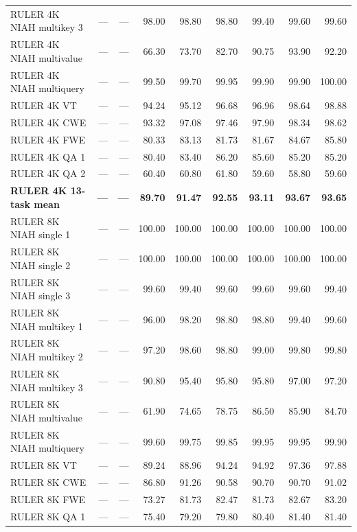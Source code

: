 \begin{longtable}{@{}lrrrrrrrr@{}}
RULER 4K NIAH multikey 3 & --- & --- & 98.00 & 98.80 & 98.80 & 99.40 & 99.60 & 99.60 \\
RULER 4K NIAH multivalue & --- & --- & 66.30 & 73.70 & 82.70 & 90.75 & 93.90 & 92.20 \\
RULER 4K NIAH multiquery & --- & --- & 99.50 & 99.70 & 99.95 & 99.90 & 99.90 & 100.00 \\
RULER 4K VT & --- & --- & 94.24 & 95.12 & 96.68 & 96.96 & 98.64 & 98.88 \\
RULER 4K CWE & --- & --- & 93.32 & 97.08 & 97.46 & 97.90 & 98.34 & 98.62 \\
RULER 4K FWE & --- & --- & 80.33 & 83.13 & 81.73 & 81.67 & 84.67 & 85.80 \\
RULER 4K QA 1 & --- & --- & 80.40 & 83.40 & 86.20 & 85.60 & 85.20 & 85.20 \\
RULER 4K QA 2 & --- & --- & 60.40 & 60.80 & 61.80 & 59.60 & 58.80 & 59.60 \\
\hline
\textbf{RULER 4K 13-task mean} & \textbf{---} & \textbf{---} & \textbf{89.70} & \textbf{91.47} & \textbf{92.55} & \textbf{93.11} & \textbf{93.67} & \textbf{93.65} \\
\hline
RULER 8K NIAH single 1 & --- & --- & 100.00 & 100.00 & 100.00 & 100.00 & 100.00 & 100.00 \\
RULER 8K NIAH single 2 & --- & --- & 100.00 & 100.00 & 100.00 & 100.00 & 100.00 & 100.00 \\
RULER 8K NIAH single 3 & --- & --- & 99.60 & 99.40 & 99.60 & 99.60 & 99.60 & 99.40 \\
RULER 8K NIAH multikey 1 & --- & --- & 96.00 & 98.20 & 98.80 & 98.80 & 99.40 & 99.60 \\
RULER 8K NIAH multikey 2 & --- & --- & 97.20 & 98.60 & 98.80 & 99.00 & 99.80 & 99.80 \\
RULER 8K NIAH multikey 3 & --- & --- & 90.80 & 95.40 & 95.80 & 95.80 & 97.00 & 97.20 \\
RULER 8K NIAH multivalue & --- & --- & 61.90 & 74.65 & 78.75 & 86.50 & 85.90 & 84.70 \\
RULER 8K NIAH multiquery & --- & --- & 99.60 & 99.75 & 99.85 & 99.95 & 99.95 & 99.90 \\
RULER 8K VT & --- & --- & 89.24 & 88.96 & 94.24 & 94.92 & 97.36 & 97.88 \\
RULER 8K CWE & --- & --- & 86.80 & 91.26 & 90.58 & 90.70 & 90.70 & 91.02 \\
RULER 8K FWE & --- & --- & 73.27 & 81.73 & 82.47 & 81.73 & 82.67 & 83.20 \\
RULER 8K QA 1 & --- & --- & 75.40 & 79.20 & 79.80 & 80.40 & 81.40 & 81.40 \\

\end{longtable}

